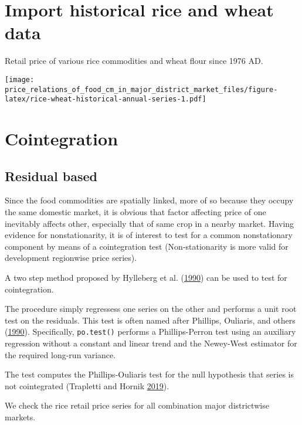 \documentclass[12pt,]{article}
\begin{document}
\hypertarget{import-historical-rice-and-wheat-data}{%
\section{Import historical rice and wheat data}\label{import-historical-rice-and-wheat-data}}

Retail price of various rice commodities and wheat flour since 1976 AD.

\texttt{[image: price\_relations\_of\_food\_cm\_in\_major\_district\_market\_files/figure-latex/rice-wheat-historical-annual-series-1.pdf]}

\hypertarget{cointegration}{%
\section{Cointegration}\label{cointegration}}

\hypertarget{residual-based}{%
\subsection{Residual based}\label{residual-based}}

Since the food commodities are spatially linked, more of so because they occupy the same domestic market, it is obvious that factor affecting price of one inevitably affects other, especially that of same crop in a nearby market. Having evidence for nonstationarity, it is of interest to test for a common nonstationary component by means of a cointegration test (Non-stationarity is more valid for development regionwise price series).

A two step method proposed by Hylleberg et al. (\protect\hyperlink{ref-hylleberg1990seasonal}{1990}) can be used to test for cointegration.

The procedure simply regressess one series on the other and performs a unit root test on the residuals. This test is often named after Phillips, Ouliaris, and others (\protect\hyperlink{ref-phillips1990asymptotic}{1990}). Specifically, \texttt{po.test()} performs a Phillips-Perron test using an auxiliary regression without a constant and linear trend and the Newey-West estimator for the required long-run variance.

The test computes the Phillips-Ouliaris test for the null hypothesis that series is not cointegrated (Trapletti and Hornik \protect\hyperlink{ref-R-tseries}{2019}).

We check the rice retail price series for all combination major districtwise markets.
\end{document}
